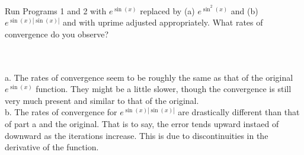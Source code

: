 Run Programs 1 and 2 with $e^{\sin(x)}$ replaced by (a) $e^{\sin^2(x)}$ and (b) $e^{\sin(x)|\sin(x)|}$
and with uprime adjusted appropriately. What rates of convergence do you observe?\\\\

\begin{solution}\renewcommand{\qedsymbol}{}\ \\
    a. The rates of convergence seem to be roughly the same as that of the original $e^{\sin(x)}$
    function. They might be a little slower, though the convergence is still very much present and
    similar to that of the original.\\




b. The rates of convergence for $e^{\sin(x)|\sin(x)|}$ are drastically different than that of part a and
the original. That is to say, the error tends upward instaed of downward as the iterations increase.
This is due to discontinuities in the derivative of the function.


\end{solution}

\newpage


\newpage
\newpage


\newpage
